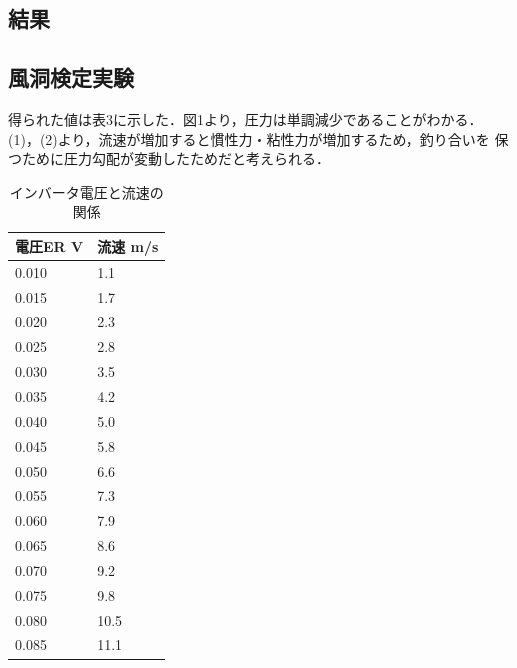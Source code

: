 \documentclass[twocolumn,10pt,a4j]{jsarticle}
\begin{document}
\begin{enumerate}
\section{結果}
  \subsection{風洞検定実験}
    得られた値は表3に示した．図1より，圧力は単調減少であることがわかる．
    (1)，(2)より，流速が増加すると慣性力・粘性力が増加するため，釣り合いを
    保つために圧力勾配が変動したためだと考えられる．
      \begin{table}[]
          \centering
            \caption{インバータ電圧と流速の関係}
            \label{my-label}
            \footnotesize
            \begin{tabular}{ll}
              電圧ER V & 流速 m/s \\ \hline
              0.010 &	1.1 \\
              0.015 &	1.7 \\
              0.020 &	2.3 \\
              0.025 &	2.8 \\
              0.030 &	3.5 \\
              0.035 &	4.2 \\
              0.040 &	5.0 \\
              0.045 &	5.8 \\
              0.050 &	6.6 \\
              0.055 &	7.3 \\
              0.060 &	7.9 \\
              0.065 &	8.6 \\
              0.070 &	9.2 \\
              0.075 &	9.8 \\
              0.080 &	10.5 \\
              0.085 &	11.1 \\
            \end{tabular}
          \end{table}
      \end{enumerate}
\end{document}
